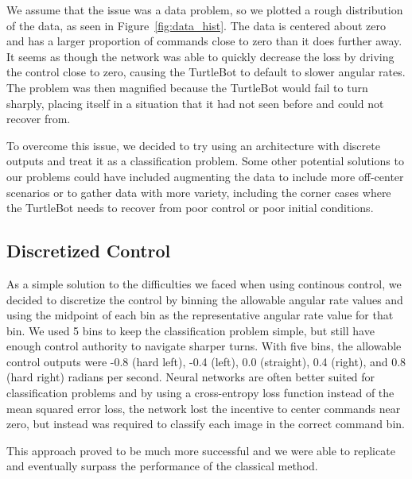 We assume that the issue was a data problem, so we plotted a rough distribution
of the data, as seen in Figure~\ref{fig:data_hist}. The data is centered about
zero and has a larger proportion of commands close to zero than it does further
away. It seems as though the network was able to quickly decrease the loss by
driving the control close to zero, causing the TurtleBot to default to slower
angular rates. The problem was then magnified because the TurtleBot would fail
to turn sharply, placing itself in a situation that it had not seen before and could not recover from.

To overcome this issue, we decided to try using an architecture with discrete
outputs and treat it as a classification problem. Some other potential solutions
to our problems could have included augmenting the data to include more
off-center scenarios or to gather data with more variety, including the corner
cases where the TurtleBot needs to recover from poor control or poor initial conditions.

\subsection{Discretized Control}
As a simple solution to the difficulties we faced when using continous control,
we decided to discretize the control by binning the allowable angular rate
values and using the midpoint of each bin as the representative angular rate
value for that bin. We used 5 bins to keep the classification problem simple,
but still have enough control authority to navigate sharper turns. With five
bins, the allowable control outputs were -0.8 (hard left), -0.4 (left), 0.0
(straight), 0.4 (right), and 0.8 (hard right) radians per second. Neural
networks are often better suited for classification problems and by using a cross-entropy loss function instead of the mean squared error loss, the network lost the incentive to center commands near zero, but instead was required to classify each image in the correct command bin.

This approach proved to be much more successful and we were able to replicate and eventually surpass the performance of the classical method.
